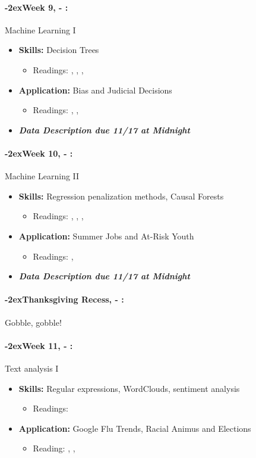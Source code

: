 \documentclass[11pt]{article}
\newcommand{\week}[1]{%
  \paragraph*{\kern-2ex\quad #1, \AdvanceDate[1]\syldate{\today} - \AdvanceDate[2]\syldate{\today}:}%
  \ifdim\wd1=\wd\MONDAY
    \AdvanceDate[7]
  \else
    \AdvanceDate[7]
  \fi%
}
\begin{document}
\week{Week 9} Machine Learning I
\begin{itemize}
  \item \textbf{Skills:} Decision Trees
  \begin{itemize}
    \item Readings: \textbf{\cite{athey2019machine}}, \textbf{\cite{varian2014bigdata}}, \cite{mullainathan2017machine}, \cite{kleinberg2015prediction}
  \end{itemize}
  \item \textbf{Application:} Bias and Judicial Decisions
  \begin{itemize}
    \item Readings: \textbf{\cite{kleinberg2018human}}, \cite{bertrand2004emily}, \cite{simonsohn2023bertrand}
  \end{itemize}
  \item \textit{\textbf{Data Description due 11/17 at Midnight}}
\end{itemize}
\week{Week 10} Machine Learning II
\begin{itemize}
  \item \textbf{Skills:} Regression penalization methods, Causal Forests
  \begin{itemize}
    \item Readings: \textbf{\cite{athey2019machine}}, \cite{varian2014bigdata}, \cite{mullainathan2017machine}, \cite{kleinberg2015prediction}
  \end{itemize}
  \item \textbf{Application:} Summer Jobs and At-Risk Youth
  \begin{itemize}
    \item Readings: \textbf{\cite{davis2017summer}}, \cite{naik2014streetscore}
  \end{itemize}
  \item \textit{\textbf{Data Description due 11/17 at Midnight}}
\end{itemize}
\week{Thanksgiving Recess} Gobble, gobble! 
\week{Week 11} Text analysis I
\begin{itemize}
  \item \textbf{Skills:} Regular expressions, WordClouds, sentiment analysis
  \begin{itemize}
    \item Readings: \textbf{\cite{gentzkow2019text}}
  \end{itemize}
  \item \textbf{Application:} Google Flu Trends, Racial Animus and Elections
  \begin{itemize}
    \item Reading: \textbf{\cite{lazer2014parable}}, \textbf{\cite{stephensdavidowitz2014racial}}, \cite{ginsberg2009influenza}
  \end{itemize}
\end{itemize}
\end{document}
